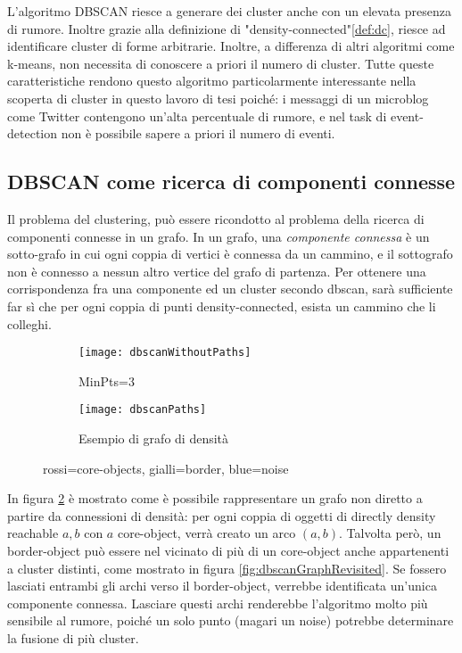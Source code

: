 L'algoritmo DBSCAN riesce  a generare dei cluster anche con un elevata presenza di rumore. Inoltre grazie alla definizione di "density-connected"\ref{def:dc}, riesce ad identificare cluster di forme arbitrarie. Inoltre, a differenza di altri algoritmi come k-means, non necessita di conoscere a priori il numero di cluster. Tutte queste caratteristiche rendono questo algoritmo particolarmente interessante nella scoperta di cluster in questo lavoro di tesi poiché: i messaggi di un microblog come Twitter contengono un'alta percentuale di rumore, e nel task di event-detection non è possibile sapere a priori il numero di eventi.
\subsection{DBSCAN come ricerca di componenti connesse }
Il problema del clustering, può essere ricondotto al problema della ricerca di componenti connesse in un grafo.
In un grafo, una \emph{componente connessa} è un sotto-grafo in cui ogni coppia di vertici è connessa da un cammino, e il sottografo non è connesso  a nessun altro vertice  del grafo di partenza. Per ottenere una corrispondenza fra una  componente ed  un cluster secondo dbscan, sarà sufficiente far sì che per ogni coppia di punti  density-connected, esista un cammino che li colleghi.
\begin{figure}
    \centering
    \begin{subfigure}[b]{0.45\textwidth}
        \centering
        \texttt{[image: dbscanWithoutPaths]}
       	\caption{ MinPts=3}
         \label{fig:densityConnectedObjects}
    \end{subfigure}
    \hfill
    \begin{subfigure}[b]{0.45\textwidth}
        \centering
        \texttt{[image: dbscanPaths]}
        \caption{Esempio di grafo di densità}
         \label{fig:graphdensityConnectedObjects}
    \end{subfigure}
    \hfill
    \caption{rossi=core-objects, gialli=border,
    	blue=noise}
    \label{fig:dbscangraph}
\end{figure} 
In figura \ref{fig:graphdensityConnectedObjects} è mostrato come è possibile rappresentare un grafo non diretto a partire da connessioni di densità: per ogni coppia di oggetti di  directly density reachable $a,b$ con $a$ core-object,
verrà creato un arco $(a,b)$.
Talvolta però, un border-object può essere nel vicinato di più di un core-object anche appartenenti a cluster distinti, come mostrato in figura \ref{fig:dbscanGraphRevisited}. Se fossero lasciati entrambi gli archi verso il border-object, verrebbe identificata un'unica componente connessa. Lasciare questi archi renderebbe l'algoritmo molto più sensibile al rumore, poiché  un solo punto (magari un noise) potrebbe determinare la fusione di più cluster.

